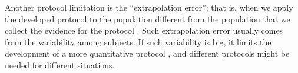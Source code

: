 \documentclass[11pt]{pnas-new}
\begin{document}
{  {\color{blue}Another protocol limitation is the}
  ``extrapolation error''; that is, when we apply the developed
  protocol to the population different from the population that we
  collect the evidence for the protocol \cite{brosnan2015modest}. {\color{blue}Such extrapolation error usually comes from the variability among subjects. If such variability is big, it
  limits the development of a more quantitative protocol
  \cite{venhola2003interobserver}, and different protocols might be needed for different situations.}
  
    
}

 
\end{document}
